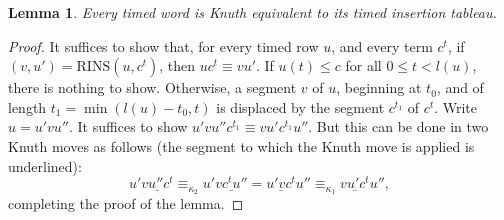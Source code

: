 \documentclass[10pt]{amsproc}
\newtheorem{lemma}[theorem]{Lemma}
\theoremstyle{definition}
\theoremstyle{remark}
\newcommand{\rowins}{\mathrm{RINS}}
\begin{document}
\begin{lemma}
  \label{lemma:reduction-to-tab}
  Every timed word is Knuth equivalent to its timed insertion tableau.
\end{lemma}
\begin{proof}
  It suffices to show that, for every timed row $u$, and every term $c^t$, if $(v,u')=\rowins(u,c^t)$, then $uc^t\equiv vu'$.
  If $u(t)\leq c$ for all $0\leq t<l(u)$, there is nothing to show.
  Otherwise, a segment $v$ of $u$, beginning at $t_0$, and of length $t_1=\min(l(u)-t_0,t)$ is displaced by the segment $c^{t_1}$ of $c^t$.
  Write $u=u'vu''$.
  It suffices to show $u'vu''c^{t_1}\equiv vu'c^{t_1}u''$.
  But this can be done in two Knuth moves as follows (the segment to which the Knuth move is applied is underlined):
  \begin{displaymath}
    u'\underline{v u'' c^t} \equiv_{\kappa_2} u'\underline{vc^tu''} = \underline{u'vc^t}u'' \equiv_{\kappa_1} \underline{vu'c^t}u'',
  \end{displaymath}
  completing the proof of the lemma.
\end{proof}
\end{document}
